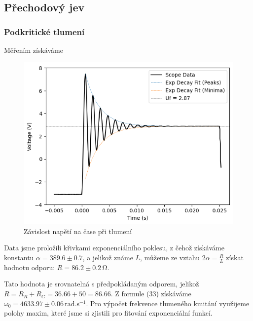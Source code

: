 \documentclass[czech,11pt,a4paper]{article}
\begin{document}
\begin{multicols}{2}
		\subsection{Přechodový jev}
		
		\subsubsection{Podkritické tlumení}
		Měřením získáváme
		\begin{figure}[H]
			\begin{center}
				\includegraphics[max width=0.9\linewidth, center]{podkriticke}
				\caption{Závislost napětí na čase při tlumení}\end{center}\end{figure}
		Data jsme proložili křivkami exponenciálního poklesu, z čehož získáváme konstantu $\alpha = 389.6 \pm 0.7$, a jelikož známe $L$, můžeme ze vztahu $2\alpha = \frac R L$ získat hodnotu odporu: $R = 86.2 \pm 0.2 \,\mathrm{\Omega}$.
		
		Tato hodnota je srovnatelná s předpokládaným odporem, jelikož \\$R=R_R + R_G = 36.66 + 50 =86.66$.
		Z formule (33) získáváme $\omega_0 = 4633.97 \pm 0.06\,\mathrm{rad.s^{-1}}$. Pro výpočet frekvence tlumeného kmitání využijeme polohy maxim, které jsme si zjistili pro fitování exponenciální funkcí.

\end{multicols}
\end{document}
